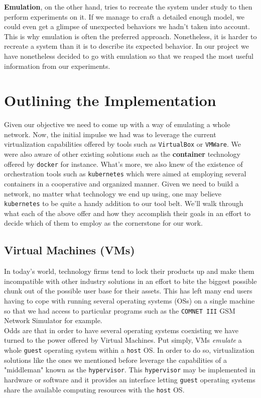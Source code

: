             \textbf{Emulation}, on the other hand, tries to recreate the system under study to then perform experiments on it. If we manage to craft a detailed enough model, we could even get a glimpse of unexpected behaviors we hadn't taken into account. This is why emulation is often the preferred approach. Nonetheless, it is harder to recreate a system than it is to describe its expected behavior. In our project we have nonetheless decided to go with emulation so that we reaped the most useful information from our experiments.\\

    \section{Outlining the Implementation}
        Given our objective we need to come up with a way of emulating a whole network. Now, the initial impulse we had was to leverage the current virtualization capabilities offered by tools such as \texttt{VirtualBox} or \texttt{VMWare}. We were also aware of other existing solutions such as the \textbf{container} technology offered by \texttt{docker} for instance. What's more, we also knew of the existence of orchestration tools such as \texttt{kubernetes} which were aimed at employing several containers in a cooperative and organized manner. Given we need to build a network, no matter what technology we end up using, one may believe \texttt{kubernetes} to be quite a handy addition to our tool belt. We'll walk through what each of the above offer and how they accomplish their goals in an effort to decide which of them to employ as the cornerstone for our work.

        \subsection{Virtual Machines (VMs)}
            In today's world, technology firms tend to lock their products up and make them incompatible with other industry solutions in an effort to bite the biggest possible chunk out of the possible user base for their assets. This has left many end users having to cope with running several operating systems (OSs) on a single machine so that we had access to particular programs such as the \texttt{COMNET III} GSM Network Simulator for example.\\

            Odds are that in order to have several operating systems coexisting we have turned to the power offered by Virtual Machines. Put simply, VMs \textit{emulate} a whole \texttt{guest} operating system within a \texttt{host} OS. In order to do so, virtualization solutions like the ones we mentioned before leverage the capabilities of a "middleman" known as the \texttt{hypervisor}. This \texttt{hypervisor} may be implemented in hardware or software and it provides an interface letting \texttt{guest} operating systems share the available computing resources with the \texttt{host} OS.\\

